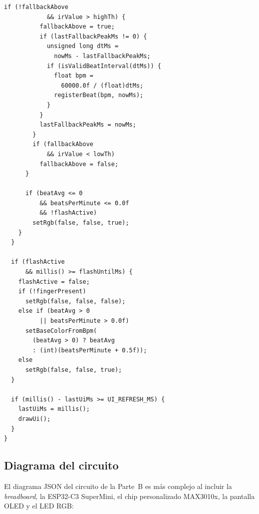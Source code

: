\documentclass[11pt,a4paper]{article}
\begin{document}
\begin{lstlisting}[language=Arduino, caption={sketch.ino -- Parte B}, label={lst:sketch-b}]
        if (!fallbackAbove
            && irValue > highTh) {
          fallbackAbove = true;
          if (lastFallbackPeakMs != 0) {
            unsigned long dtMs =
              nowMs - lastFallbackPeakMs;
            if (isValidBeatInterval(dtMs)) {
              float bpm =
                60000.0f / (float)dtMs;
              registerBeat(bpm, nowMs);
            }
          }
          lastFallbackPeakMs = nowMs;
        }
        if (fallbackAbove
            && irValue < lowTh)
          fallbackAbove = false;
      }

      if (beatAvg <= 0
          && beatsPerMinute <= 0.0f
          && !flashActive)
        setRgb(false, false, true);
    }
  }

  if (flashActive
      && millis() >= flashUntilMs) {
    flashActive = false;
    if (!fingerPresent)
      setRgb(false, false, false);
    else if (beatAvg > 0
          || beatsPerMinute > 0.0f)
      setBaseColorFromBpm(
        (beatAvg > 0) ? beatAvg
        : (int)(beatsPerMinute + 0.5f));
    else
      setRgb(false, false, true);
  }

  if (millis() - lastUiMs >= UI_REFRESH_MS) {
    lastUiMs = millis();
    drawUi();
  }
}
\end{lstlisting}

\subsection{Diagrama del circuito}

El diagrama JSON del circuito de la Parte~B es más complejo al incluir la \textit{breadboard}, la ESP32-C3 SuperMini, el chip personalizado MAX3010x, la pantalla OLED y el LED RGB:
\end{document}
